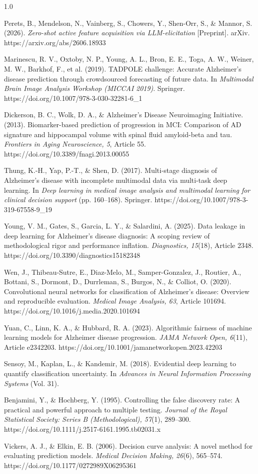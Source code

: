 \documentclass[12pt,twoside]{article}
\begin{document}
\begin{spacing}{1.0}
\begin{enumerate}[{[1]}]
\item Perets, B., Mendelson, N., Vainberg, S., Chowers, Y., Shen-Orr, S., \& Mannor, S. (2026). \textit{Zero-shot active feature acquisition via LLM-elicitation} [Preprint]. arXiv. https://arxiv.org/abs/2606.18933
\item Marinescu, R. V., Oxtoby, N. P., Young, A. L., Bron, E. E., Toga, A. W., Weiner, M. W., Barkhof, F., et al. (2019). TADPOLE challenge: Accurate Alzheimer's disease prediction through crowdsourced forecasting of future data. In \textit{Multimodal Brain Image Analysis Workshop (MICCAI 2019)}. Springer. https://doi.org/10.1007/978-3-030-32281-6\_1
\item Dickerson, B. C., Wolk, D. A., \& Alzheimer's Disease Neuroimaging Initiative. (2013). Biomarker-based prediction of progression in MCI: Comparison of AD signature and hippocampal volume with spinal fluid amyloid-beta and tau. \textit{Frontiers in Aging Neuroscience, 5}, Article 55. https://doi.org/10.3389/fnagi.2013.00055
\item Thung, K.-H., Yap, P.-T., \& Shen, D. (2017). Multi-stage diagnosis of Alzheimer's disease with incomplete multimodal data via multi-task deep learning. In \textit{Deep learning in medical image analysis and multimodal learning for clinical decision support} (pp. 160--168). Springer. https://doi.org/10.1007/978-3-319-67558-9\_19
\item Young, V. M., Gates, S., Garcia, L. Y., \& Salardini, A. (2025). Data leakage in deep learning for Alzheimer's disease diagnosis: A scoping review of methodological rigor and performance inflation. \textit{Diagnostics, 15}(18), Article 2348. https://doi.org/10.3390/diagnostics15182348
\item Wen, J., Thibeau-Sutre, E., Diaz-Melo, M., Samper-Gonzalez, J., Routier, A., Bottani, S., Dormont, D., Durrleman, S., Burgos, N., \& Colliot, O. (2020). Convolutional neural networks for classification of Alzheimer's disease: Overview and reproducible evaluation. \textit{Medical Image Analysis, 63}, Article 101694. https://doi.org/10.1016/j.media.2020.101694
\item Yuan, C., Linn, K. A., \& Hubbard, R. A. (2023). Algorithmic fairness of machine learning models for Alzheimer disease progression. \textit{JAMA Network Open, 6}(11), Article e2342203. https://doi.org/10.1001/jamanetworkopen.2023.42203
\item Sensoy, M., Kaplan, L., \& Kandemir, M. (2018). Evidential deep learning to quantify classification uncertainty. In \textit{Advances in Neural Information Processing Systems} (Vol. 31).
\item Benjamini, Y., \& Hochberg, Y. (1995). Controlling the false discovery rate: A practical and powerful approach to multiple testing. \textit{Journal of the Royal Statistical Society: Series B (Methodological), 57}(1), 289--300. https://doi.org/10.1111/j.2517-6161.1995.tb02031.x
\item Vickers, A. J., \& Elkin, E. B. (2006). Decision curve analysis: A novel method for evaluating prediction models. \textit{Medical Decision Making, 26}(6), 565--574. https://doi.org/10.1177/0272989X06295361
\end{enumerate}
\endgroup


\end{spacing}
\end{document}
